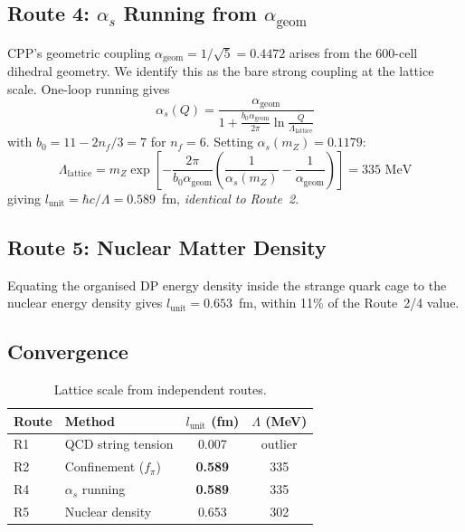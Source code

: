 \documentclass[12pt,a4paper]{article}
\begin{document}
\subsection{Route 4: $\alpha_s$ Running from $\alpha_{\mathrm{geom}}$}
\label{sec:route4}

CPP's geometric coupling $\alpha_{\mathrm{geom}} = 1/\sqrt{5} = 0.4472$ arises from the 600-cell dihedral geometry. We identify this as the bare strong coupling at the lattice scale. One-loop running gives
\begin{equation}
\alpha_s(Q) = \frac{\alpha_{\mathrm{geom}}}{1 + \frac{b_0 \alpha_{\mathrm{geom}}}{2\pi}\ln\frac{Q}{\Lambda_{\mathrm{lattice}}}}
\label{eq:running}
\end{equation}
with $b_0 = 11 - 2n_f/3 = 7$ for $n_f = 6$. Setting $\alpha_s(m_Z) = 0.1179$:
\begin{equation}
\Lambda_{\mathrm{lattice}} = m_Z \exp\!\left[-\frac{2\pi}{b_0\alpha_{\mathrm{geom}}}\left(\frac{1}{\alpha_s(m_Z)} - \frac{1}{\alpha_{\mathrm{geom}}}\right)\right] = 335 \text{ MeV}
\end{equation}
giving $l_{\mathrm{unit}} = \hbar c / \Lambda = 0.589$~fm, \emph{identical to Route~2}.

\subsection{Route 5: Nuclear Matter Density}

Equating the organised DP energy density inside the strange quark cage to the nuclear energy density gives $l_{\mathrm{unit}} = 0.653$~fm, within 11\% of the Route~2/4 value.

\subsection{Convergence}

\begin{table}[h]
\centering
\caption{Lattice scale from independent routes.}
\label{tab:routes}
\begin{tabular}{llcc}
\toprule
Route & Method & $l_{\mathrm{unit}}$ (fm) & $\Lambda$ (MeV) \\
\midrule
R1 & QCD string tension & 0.007 & outlier \\
R2 & Confinement ($f_\pi$) & \textbf{0.589} & 335 \\
R4 & $\alpha_s$ running & \textbf{0.589} & 335 \\
R5 & Nuclear density & 0.653 & 302 \\
\bottomrule
\end{tabular}
\end{table}
\end{document}
